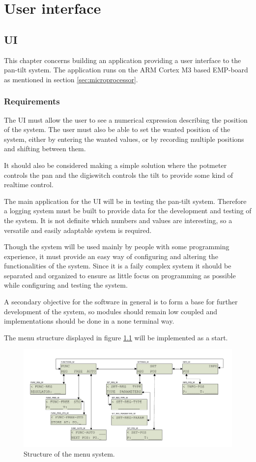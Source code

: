 \chapter{User interface}\label{chap:ui}

\section{UI}
This chapter concerns building an application providing a user interface to the
pan-tilt system. The application runs on the ARM Cortex M3 based EMP-board
as mentioned in section \ref{sec:microprocessor}.

\subsection{Requirements}
The UI must allow the user to see a numerical expression
describing the position of the system. The user must also be able to set the
wanted position of the system, either by entering the wanted values, or by
recording multiple positions and shifting between them.

It should also be considered making a simple solution where the potmeter
controls the pan and the digiswitch controls the tilt to provide some kind of
realtime control.

The main application for the UI will be in testing the pan-tilt system.
Therefore a logging system must be built to provide data for the development
and testing of the system. It is not definite which numbers and values are
interesting, so a versatile and easily adaptable system is required.

Though the system will be used mainly by people with some programming
experience, it must provide an easy way of configuring and altering the functionalities of the system. Since it is a faily complex system it should be separated and organized to ensure as little focus on programming as possible while configuring and testing the system.

A secondary objective for the software in general is to form a base for further development of the system, so modules should remain low coupled and implementations should be done in a none terminal way.

The  menu structure displayed in figure \ref{fig:ui_menu_structure} will be implemented as a start.

\begin{figure}[htb]
	\centering
	\includegraphics[width=\textwidth,clip,trim=10 15 10 15]{graphics/menu_structure.pdf} 
	\caption{Structure of the menu system.}
	\label{fig:ui_menu_structure}
\end{figure}

